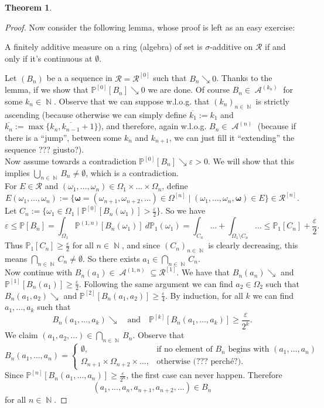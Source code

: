 \documentclass[12pt,a4paper]{report}
\theoremstyle{definition}
\newtheorem{theorem}{Theorem}[chapter] %
\theoremstyle{num.custom-title}
\DeclareMathOperator{\A}{\mathcal{A}}
\DeclareMathOperator{\N}{\mathbb{N}}
\DeclareMathOperator{\sm}{\setminus}
\DeclareMathOperator{\sse}{\subseteq}
\newcommand{\ol}{\overline}
\newcommand{\RR}{\mathcal{R}}
\renewcommand{\epsilon}{\varepsilon}
\renewcommand{\1}{\mathbbm{1}}
\renewcommand{\P}{\mathbb{P}}
\begin{document}
\begin{theorem}
\begin{proof}
Now consider the following lemma, whose proof is left as an easy exercise:
\begin{center}
A finitely additive measure on a ring (algebra) of set is $\sigma$-additive on $\RR$ if and only if it's continuous at $\emptyset$.
\end{center}
Let $(B_n)$ be a a sequence in $\RR = \RR^{[0]}$ such that $B_n \searrow 0$. Thanks to the lemma, if we show that $\P^{[0]}[B_n] \searrow 0$ we are done. Of course $B_n \in \A^{(k_n)}$ for some $k_n \in \N$. Observe that we can suppose w.l.o.g. that $(k_n)_{n \in \N}$ is strictly ascending (because otherwise we can simply define $\ol{k_1} := k_1$ and $\ol{k_n} := \max\{k_n, \ol{k_{n-1}}+1\}$), and therefore, again w.l.o.g. $B_n \in \A^{(n)}$ (because if there is a ``jump'', between some $k_n$ and $k_{n+1}$, we can just fill it ``extending'' the sequence ??? giusto?).\\
Now assume towards a contradiction $\P^{[0]}[B_n] \searrow \epsilon > 0$. We will show that this implies $\bigcup_{n \in \N} B_n \neq \emptyset$, which is a contradiction.\\
For $E \in \RR$ and $(\omega_1,...,\omega_n) \in \Omega_1 \times ... \times \Omega_n$, define
\[
E(\omega_1,\ldots,\omega_n) := \{ \boldsymbol{\omega} = (\omega_{n+1}, \omega_{n+2},\ldots) \in \Omega^{[n]} \mid (\omega_1,\ldots,\omega_n,\boldsymbol{\omega}) \in E \} \in \RR^{[n]}.
\]
Let $C_n := \{ \omega_1 \in \Omega_1 \mid \P^{[0]}[B_n(\omega_1)] > \frac{\epsilon}{2} \}$. So we have
\[
\epsilon \leq \P[B_n] = \int_{\Omega_1} \P^{(1,n)}[B_n(\omega_1)] \ d\P_1(\omega_1) = \int_{C_n} ... + \int_{\Omega_1 \sm C_n} ... \leq \P_1[C_n]+\frac{\epsilon}{2}.
\]
Thus $\P_1[C_n] \geq \frac{\epsilon}{2}$ for all $n \in \N$, and since $(C_n)_{n \in \N}$ is clearly decreasing, this means $\bigcap_{n \in \N} C_n \neq \emptyset$. So there exists $a_1 \in \bigcap_{n \in \N} C_n$.\\
Now continue with $B_n(a_1) \in \A^{(1,n)} \sse \RR^{[1]}$. We have that $B_n(a_n) \searrow$ and $\P^{[1]}[B_n(a_1)] \geq \frac{\epsilon}{2}$. Following the same argument we can find $a_2 \in \Omega_2$ such that $B_n(a_1,a_2) \searrow$ and $\P^{[2]}[B_n(a_1,a_2)] \geq \frac{\epsilon}{4}$.
By induction, for all $k$ we can find $a_1,...,a_k$ such that
\[
B_n(a_1,\ldots,a_k) \searrow \quad \text{and} \quad \P^{[k]}[B_n(a_1,\ldots,a_k)] \geq \frac{\epsilon}{2^k}.
\]
We claim $(a_1,a_2,...) \in \bigcap_{n \in \N} B_n$. Observe that
\[
B_n(a_1,\ldots,a_n) = 
\begin{cases}
\emptyset, &\text{if no element of $B_n$ begins with $(a_1,\ldots,a_n)$}\\
\Omega_{n+1} \times \Omega_{n+2} \times \ldots, &\text{otherwise (??? perché?)}.
\end{cases}
\]
Since $\P^{[n]}[B_n(a_1,\ldots,a_n)] \geq \frac{\epsilon}{2^n}$, the first case can never happen. Therefore 
\[
(a_1,...,a_n,a_{n+1},a_{n+2},...) \in B_n
\]
for all $n \in \N$.
\end{proof}
\end{theorem}
\end{document}
